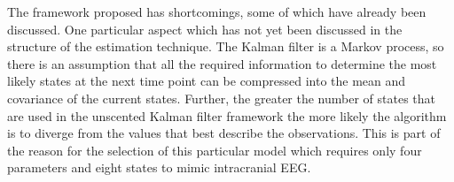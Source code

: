 
The framework proposed has shortcomings, some of which have already been discussed. One particular aspect which has not yet been discussed in the structure of the estimation technique. The Kalman filter is a Markov process, so there is an assumption that all the required information to determine the most likely states at the next time point can be compressed into the mean and covariance of the current states. Further, the greater the number of states that are used in the unscented Kalman filter framework the more likely the algorithm is to diverge from the values that best describe the observations. This is part of the reason for the selection of this particular model which requires only four parameters and eight states to mimic intracranial EEG.

